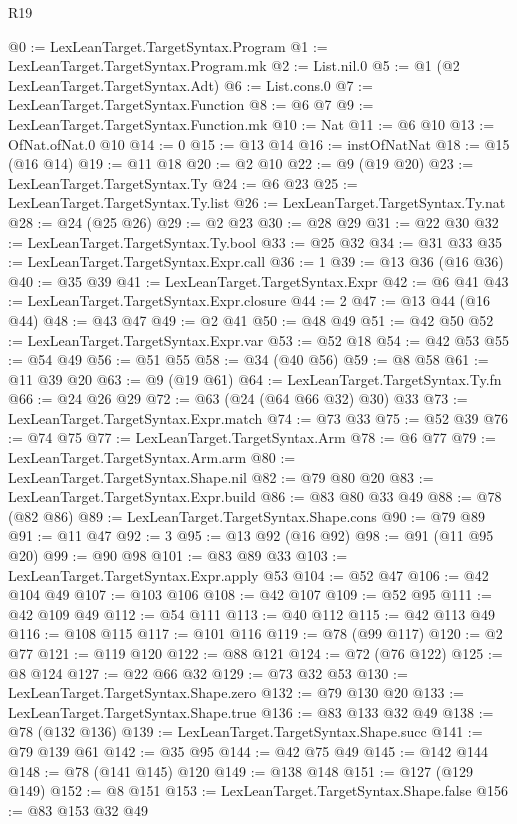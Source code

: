 \begin{lexlean}{R19}
\begin{coremodule}
@0 := LexLeanTarget.TargetSyntax.Program
@1 := LexLeanTarget.TargetSyntax.Program.mk
@2 := List.nil.{0}
@5 := @1 (@2 LexLeanTarget.TargetSyntax.Adt)
@6 := List.cons.{0}
@7 := LexLeanTarget.TargetSyntax.Function
@8 := @6 @7
@9 := LexLeanTarget.TargetSyntax.Function.mk
@10 := Nat
@11 := @6 @10
@13 := OfNat.ofNat.{0} @10
@14 := 0
@15 := @13 @14
@16 := instOfNatNat
@18 := @15 (@16 @14)
@19 := @11 @18
@20 := @2 @10
@22 := @9 (@19 @20)
@23 := LexLeanTarget.TargetSyntax.Ty
@24 := @6 @23
@25 := LexLeanTarget.TargetSyntax.Ty.list
@26 := LexLeanTarget.TargetSyntax.Ty.nat
@28 := @24 (@25 @26)
@29 := @2 @23
@30 := @28 @29
@31 := @22 @30
@32 := LexLeanTarget.TargetSyntax.Ty.bool
@33 := @25 @32
@34 := @31 @33
@35 := LexLeanTarget.TargetSyntax.Expr.call
@36 := 1
@39 := @13 @36 (@16 @36)
@40 := @35 @39
@41 := LexLeanTarget.TargetSyntax.Expr
@42 := @6 @41
@43 := LexLeanTarget.TargetSyntax.Expr.closure
@44 := 2
@47 := @13 @44 (@16 @44)
@48 := @43 @47
@49 := @2 @41
@50 := @48 @49
@51 := @42 @50
@52 := LexLeanTarget.TargetSyntax.Expr.var
@53 := @52 @18
@54 := @42 @53
@55 := @54 @49
@56 := @51 @55
@58 := @34 (@40 @56)
@59 := @8 @58
@61 := @11 @39 @20
@63 := @9 (@19 @61)
@64 := LexLeanTarget.TargetSyntax.Ty.fn
@66 := @24 @26 @29
@72 := @63 (@24 (@64 @66 @32) @30) @33
@73 := LexLeanTarget.TargetSyntax.Expr.match
@74 := @73 @33
@75 := @52 @39
@76 := @74 @75
@77 := LexLeanTarget.TargetSyntax.Arm
@78 := @6 @77
@79 := LexLeanTarget.TargetSyntax.Arm.arm
@80 := LexLeanTarget.TargetSyntax.Shape.nil
@82 := @79 @80 @20
@83 := LexLeanTarget.TargetSyntax.Expr.build
@86 := @83 @80 @33 @49
@88 := @78 (@82 @86)
@89 := LexLeanTarget.TargetSyntax.Shape.cons
@90 := @79 @89
@91 := @11 @47
@92 := 3
@95 := @13 @92 (@16 @92)
@98 := @91 (@11 @95 @20)
@99 := @90 @98
@101 := @83 @89 @33
@103 := LexLeanTarget.TargetSyntax.Expr.apply @53
@104 := @52 @47
@106 := @42 @104 @49
@107 := @103 @106
@108 := @42 @107
@109 := @52 @95
@111 := @42 @109 @49
@112 := @54 @111
@113 := @40 @112
@115 := @42 @113 @49
@116 := @108 @115
@117 := @101 @116
@119 := @78 (@99 @117)
@120 := @2 @77
@121 := @119 @120
@122 := @88 @121
@124 := @72 (@76 @122)
@125 := @8 @124
@127 := @22 @66 @32
@129 := @73 @32 @53
@130 := LexLeanTarget.TargetSyntax.Shape.zero
@132 := @79 @130 @20
@133 := LexLeanTarget.TargetSyntax.Shape.true
@136 := @83 @133 @32 @49
@138 := @78 (@132 @136)
@139 := LexLeanTarget.TargetSyntax.Shape.succ
@141 := @79 @139 @61
@142 := @35 @95
@144 := @42 @75 @49
@145 := @142 @144
@148 := @78 (@141 @145) @120
@149 := @138 @148
@151 := @127 (@129 @149)
@152 := @8 @151
@153 := LexLeanTarget.TargetSyntax.Shape.false
@156 := @83 @153 @32 @49

\end{coremodule}
\end{lexlean}
